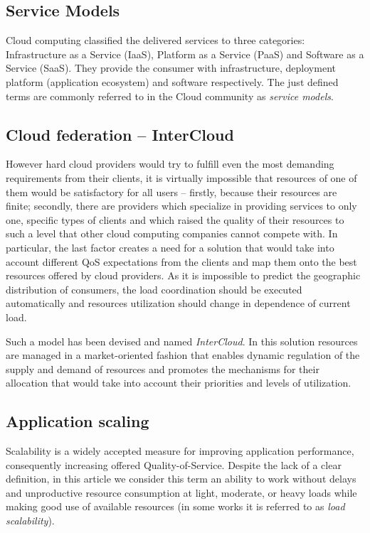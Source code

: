 \documentclass[twocolumn]{svjour3}          %
\begin{document}
\subsection{Service Models}
Cloud computing classified the delivered services to three categories: Infrastructure as a Service (IaaS), Platform as a Service (PaaS) and Software as a Service (SaaS). They provide the consumer with infrastructure, deployment platform (application ecosystem) and software respectively. The just defined terms are commonly referred to in the Cloud community as \emph{service models}.

\subsection{Cloud federation -- InterCloud}
However hard cloud providers would try to fulfill even the most demanding requirements from their clients, it is virtually impossible that resources of one of them would be satisfactory for all users -- firstly, because their resources are finite; secondly, there are providers which specialize in providing services to only one, specific types of clients and which raised the quality of their resources to such a level that other cloud computing companies cannot compete with.
In particular, the last factor creates a need for a solution that would take into account different QoS expectations from the clients and map them onto the best resources offered by cloud providers. As it is impossible to predict the geographic distribution of consumers, the load coordination should be executed automatically and resources utilization should change in dependence of current load.

Such a model has been devised and named \emph{InterCloud}. In this solution resources are managed in a market-oriented fashion that enables dynamic regulation of the supply and demand of resources and promotes the mechanisms for their allocation that would take into account their priorities and levels of utilization.

\subsection{Application scaling}
Scalability is a widely accepted measure for improving application performance, consequently increasing offered Quality-of-Service. Despite the lack of a clear definition, in this article we consider this term an ability to work without delays and unproductive resource consumption at light, moderate, or heavy loads while making good use of available resources (in some works it is referred to as \emph{load scalability}).
\end{document}
